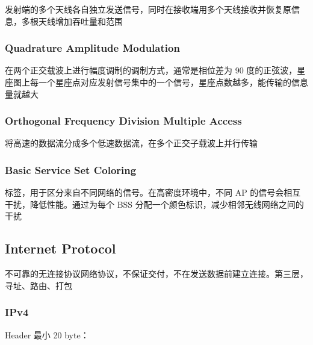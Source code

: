 \documentclass[11pt,journal,compsoc]{IEEEtran}
\begin{document}
发射端的多个天线各自独立发送信号，同时在接收端用多个天线接收并恢复原信息，多根天线增加吞吐量和范围


\subsubsection{Quadrature Amplitude Modulation}

在两个正交载波上进行幅度调制的调制方式，通常是相位差为 90 度的正弦波，星座图上每一个星座点对应发射信号集中的一个信号，星座点数越多，能传输的信息量就越大


\subsubsection{Orthogonal Frequency Division Multiple Access}

将高速的数据流分成多个低速数据流，在多个正交子载波上并行传输


\subsubsection{Basic Service Set Coloring}

标签，用于区分来自不同网络的信号。在高密度环境中，不同 AP 的信号会相互干扰，降低性能。通过为每个 BSS 分配一个颜色标识，减少相邻无线网络之间的干扰


\subsection{Internet Protocol}

不可靠的无连接协议网络协议，不保证交付，不在发送数据前建立连接。第三层，寻址、路由、打包


\subsubsection{IPv4}

Header 最小 20 byte：
\end{document}
